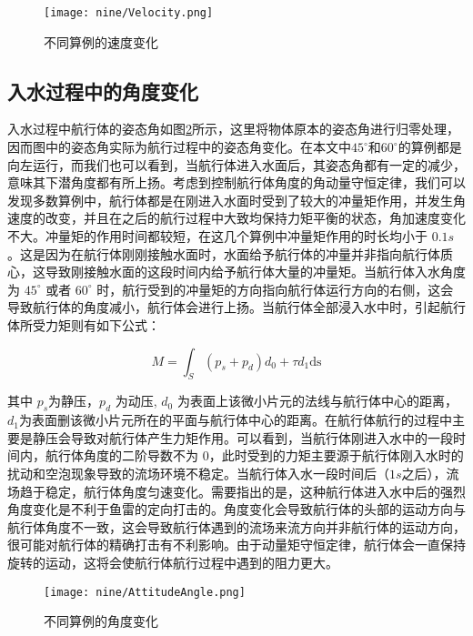 \begin{figure}[!htp]
  \centering
  \texttt{[image: nine/Velocity.png]}
  \caption{不同算例的速度变化}
  \label{fig:nine_velocity}
\end{figure}

\subsection{入水过程中的角度变化}

入水过程中航行体的姿态角如图\ref{fig:nine_angle}所示，这里将物体原本的姿态角进行归零处理，因而图中的姿态角实际为航行过程中的姿态角变化。在本文中$45^\circ$和$60^\circ$的算例都是向左运行，而我们也可以看到，当航行体进入水面后，其姿态角都有一定的减少，意味其下潜角度都有所上扬。考虑到控制航行体角度的角动量守恒定律，我们可以发现多数算例中，航行体都是在刚进入水面时受到了较大的冲量矩作用，并发生角速度的改变，并且在之后的航行过程中大致均保持力矩平衡的状态，角加速度变化不大。冲量矩的作用时间都较短，在这几个算例中冲量矩作用的时长均小于 $0.1s$。这是因为在航行体刚刚接触水面时，水面给予航行体的冲量并非指向航行体质心，这导致刚接触水面的这段时间内给予航行体大量的冲量矩。当航行体入水角度为 $45 ^\circ$ 或者 $60 ^\circ$ 时，航行受到的冲量矩的方向指向航行体运行方向的右侧，这会导致航行体的角度减小，航行体会进行上扬。当航行体全部浸入水中时，引起航行体所受力矩则有如下公式：

\begin{equation}
  M = \int_S \left( p_{s} + p_{d} \right) d_0 + \tau d_1 \mathrm {ds}
\end{equation}

其中 $p_s$为静压，$p_d$ 为动压, $d_0$ 为表面上该微小片元的法线与航行体中心的距离， $d_1$为表面删该微小片元所在的平面与航行体中心的距离。在航行体航行的过程中主要是静压会导致对航行体产生力矩作用。可以看到，当航行体刚进入水中的一段时间内，航行体角度的二阶导数不为 $0$，此时受到的力矩主要源于航行体刚入水时的扰动和空泡现象导致的流场环境不稳定。当航行体入水一段时间后（$1s$之后），流场趋于稳定，航行体角度匀速变化。需要指出的是，这种航行体进入水中后的强烈角度变化是不利于鱼雷的定向打击的。角度变化会导致航行体的头部的运动方向与航行体角度不一致，这会导致航行体遇到的流场来流方向并非航行体的运动方向，很可能对航行体的精确打击有不利影响。由于动量矩守恒定律，航行体会一直保持旋转的运动，这将会使航行体航行过程中遇到的阻力更大。

\begin{figure}[!htp]
  \centering
  \texttt{[image: nine/AttitudeAngle.png]}
  \caption{不同算例的角度变化}
  \label{fig:nine_angle}
\end{figure}

